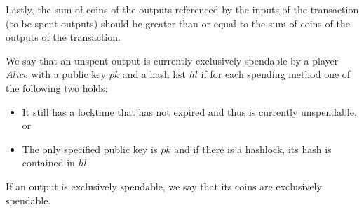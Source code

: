 Lastly, the sum of coins of the outputs referenced by the inputs of the
transaction (to-be-spent outputs) should be greater than or equal to the sum of
coins of the outputs of the transaction.

We say that an unspent output is currently exclusively spendable by a player
$Alice$ with a public key $pk$ and a hash list $hl$ if for each spending method
one of the following two holds:
\begin{itemize}
  \item It still has a locktime that has not expired and thus is currently
  unspendable, or
  \item The only specified public key is $pk$ and if there is a hashlock, its
  hash is contained in $hl$.
\end{itemize}
If an output is exclusively spendable, we say that its coins are exclusively
spendable.
